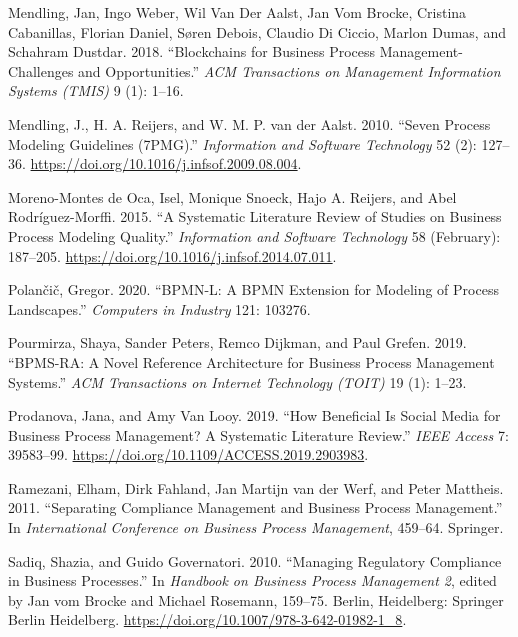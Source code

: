 \documentclass[
  letterpaper,
  DIV=11,
  numbers=noendperiod]{scrreprt}
\newlength{\cslhangindent}
\newlength{\cslentryspacingunit} %
\newenvironment{CSLReferences}[2] %
 {%
  \setlength{\parindent}{0pt}
  \ifodd #1
  \let\oldpar\par
  \def\par{\hangindent=\cslhangindent\oldpar}
  \fi
  \setlength{\parskip}{#2\cslentryspacingunit}
 }%
 {}
\begin{document}
\begin{CSLReferences}{1}{0}
\leavevmode{}%
Mendling, Jan, Ingo Weber, Wil Van Der Aalst, Jan Vom Brocke, Cristina
Cabanillas, Florian Daniel, Søren Debois, Claudio Di Ciccio, Marlon
Dumas, and Schahram Dustdar. 2018. {``Blockchains for Business Process
Management-Challenges and Opportunities.''} \emph{ACM Transactions on
Management Information Systems (TMIS)} 9 (1): 1--16.

\leavevmode{}%
Mendling, J., H. A. Reijers, and W. M. P. van der Aalst. 2010. {``Seven
Process Modeling Guidelines ({7PMG}).''} \emph{Information and Software
Technology} 52 (2): 127--36.
\url{https://doi.org/10.1016/j.infsof.2009.08.004}.

\leavevmode{}%
Moreno-Montes de Oca, Isel, Monique Snoeck, Hajo A. Reijers, and Abel
Rodríguez-Morffi. 2015. {``A Systematic Literature Review of Studies on
Business Process Modeling Quality.''} \emph{Information and Software
Technology} 58 (February): 187--205.
\url{https://doi.org/10.1016/j.infsof.2014.07.011}.

\leavevmode{}%
Polančič, Gregor. 2020. {``{BPMN-L}: {A BPMN} Extension for Modeling of
Process Landscapes.''} \emph{Computers in Industry} 121: 103276.

\leavevmode{}%
Pourmirza, Shaya, Sander Peters, Remco Dijkman, and Paul Grefen. 2019.
{``{BPMS-RA}: A Novel Reference Architecture for Business Process
Management Systems.''} \emph{ACM Transactions on Internet Technology
(TOIT)} 19 (1): 1--23.

\leavevmode{}%
Prodanova, Jana, and Amy Van Looy. 2019. {``How {Beneficial} Is {Social
Media} for {Business Process Management}? {A Systematic Literature
Review}.''} \emph{IEEE Access} 7: 39583--99.
\url{https://doi.org/10.1109/ACCESS.2019.2903983}.

\leavevmode{}%
Ramezani, Elham, Dirk Fahland, Jan Martijn van der Werf, and Peter
Mattheis. 2011. {``Separating Compliance Management and Business Process
Management.''} In \emph{International {Conference} on {Business Process
Management}}, 459--64. {Springer}.

\leavevmode{}%
Sadiq, Shazia, and Guido Governatori. 2010. {``Managing {Regulatory
Compliance} in {Business Processes}.''} In \emph{Handbook on {Business
Process Management} 2}, edited by Jan vom Brocke and Michael Rosemann,
159--75. {Berlin, Heidelberg}: {Springer Berlin Heidelberg}.
\url{https://doi.org/10.1007/978-3-642-01982-1_8}.


\end{CSLReferences}
\end{document}
